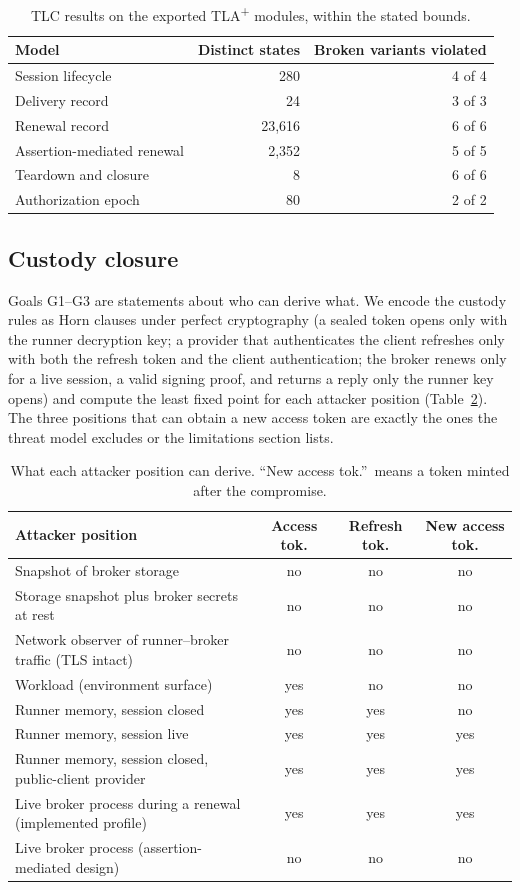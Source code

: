 \documentclass[11pt]{article}
\begin{document}
\begin{table}[t]
\centering
\small
\begin{tabular}{@{}lrr@{}}
\toprule
Model & Distinct states & Broken variants violated \\
\midrule
Session lifecycle & 280 & 4 of 4 \\
Delivery record & 24 & 3 of 3 \\
Renewal record & 23,616 & 6 of 6 \\
Assertion-mediated renewal & 2,352 & 5 of 5 \\
Teardown and closure & 8 & 6 of 6 \\
Authorization epoch & 80 & 2 of 2 \\
\bottomrule
\end{tabular}
\caption{TLC results on the exported TLA\textsuperscript{+} modules, within the stated bounds.}
\label{tab:tlc}
\end{table}

\subsection{Custody closure}
\label{sec:custody}
Goals G1--G3 are statements about who can derive what. We encode the custody rules as Horn clauses under perfect cryptography (a sealed token opens only with the runner decryption key; a provider that authenticates the client refreshes only with both the refresh token and the client authentication; the broker renews only for a live session, a valid signing proof, and returns a reply only the runner key opens) and compute the least fixed point for each attacker position (Table~\ref{tab:custody}). The three positions that can obtain a new access token are exactly the ones the threat model excludes or the limitations section lists.

\begin{table}[t]
\centering
\small
\begin{tabular}{@{}p{}ccc@{}}
\toprule
Attacker position & Access tok. & Refresh tok. & New access tok. \\
\midrule
Snapshot of broker storage & no & no & no \\
Storage snapshot plus broker secrets at rest & no & no & no \\
Network observer of runner--broker traffic (TLS intact) & no & no & no \\
Workload (environment surface) & yes & no & no \\
Runner memory, session closed & yes & yes & no \\
Runner memory, session live & yes & yes & yes \\
Runner memory, session closed, public-client provider & yes & yes & yes \\
Live broker process during a renewal (implemented profile) & yes & yes & yes \\
Live broker process (assertion-mediated design) & no & no & no \\
\bottomrule
\end{tabular}
\caption{What each attacker position can derive. ``New access tok.''\ means a token minted after the compromise.}
\label{tab:custody}
\end{table}
\end{document}
